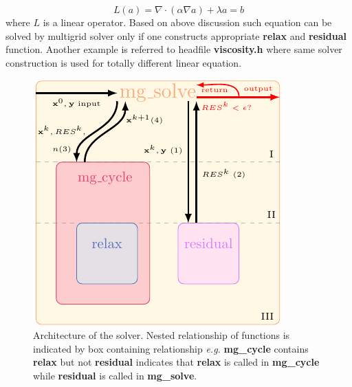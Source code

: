 \documentclass[a4paper]{article}
\newcommand{\func}[1]{\textbf{\textcolor{function}{#1}}}
\begin{document}
\begin{equation}\label{equ:poisson}
  L(a)=\nabla\cdot(\alpha\nabla a) + \lambda a =b
\end{equation}
where $L$ is a linear operator. Based on above discussion such equation can be solved by multigrid solver only if one constructs appropriate \func{relax} and \func{residual} function. Another example is referred to headfile \textbf{viscosity.h} where same solver construction is used for totally different linear equation. 

\begin{figure}[H]
    \centering
    \includegraphics[width=\textwidth]{image/mgsolver.pdf}
    \caption{Architecture of the solver. Nested relationship of functions is indicated by box containing relationship \emph{e.g.} \func{mg\_cycle} contains \func{relax} but not \func{residual} indicates that \func{relax} is called in \func{mg\_cycle} while \func{residual} is called in \func{mg\_solve}.}
    \label{fig:workflow}
\end{figure}
\end{document}
